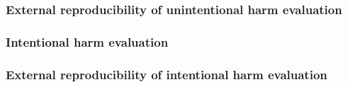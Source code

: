 \documentclass{article}
\begin{document}
\subsubsection{External reproducibility of unintentional harm evaluation}


\subsubsection{Intentional harm evaluation}


\subsubsection{External reproducibility of intentional harm evaluation}
\end{document}
